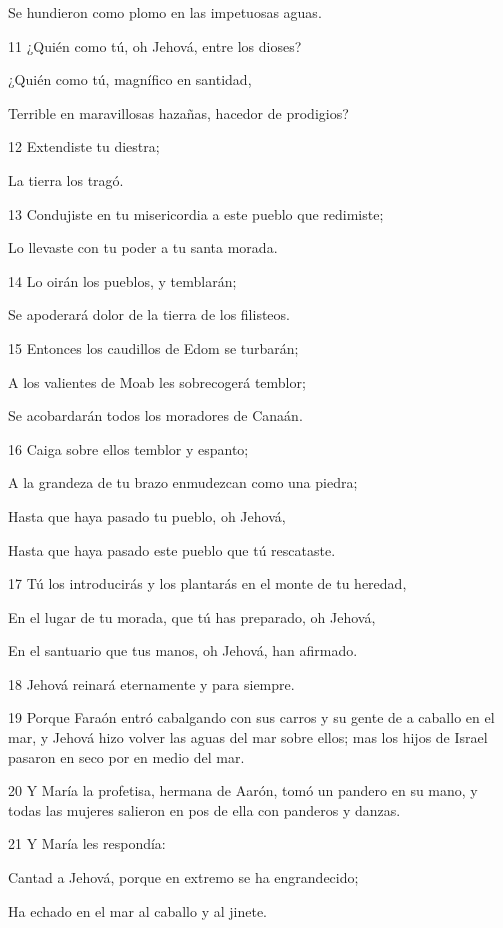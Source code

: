 \par Se hundieron como plomo en las impetuosas aguas.
\par 11 ¿Quién como tú, oh Jehová, entre los dioses?
\par ¿Quién como tú, magnífico en santidad,
\par Terrible en maravillosas hazañas, hacedor de prodigios?
\par 12 Extendiste tu diestra;
\par La tierra los tragó.
\par 13 Condujiste en tu misericordia a este pueblo que redimiste;
\par Lo llevaste con tu poder a tu santa morada.
\par 14 Lo oirán los pueblos, y temblarán;
\par Se apoderará dolor de la tierra de los filisteos.
\par 15 Entonces los caudillos de Edom se turbarán;
\par A los valientes de Moab les sobrecogerá temblor;
\par Se acobardarán todos los moradores de Canaán.
\par 16 Caiga sobre ellos temblor y espanto;
\par A la grandeza de tu brazo enmudezcan como una piedra;
\par Hasta que haya pasado tu pueblo, oh Jehová,
\par Hasta que haya pasado este pueblo que tú rescataste.
\par 17 Tú los introducirás y los plantarás en el monte de tu heredad,
\par En el lugar de tu morada, que tú has preparado, oh Jehová,
\par En el santuario que tus manos, oh Jehová, han afirmado.
\par 18 Jehová reinará eternamente y para siempre.
\par 19 Porque Faraón entró cabalgando con sus carros y su gente de a caballo en el mar, y Jehová hizo volver las aguas del mar sobre ellos; mas los hijos de Israel pasaron en seco por en medio del mar.
\par 20 Y María la profetisa, hermana de Aarón, tomó un pandero en su mano, y todas las mujeres salieron en pos de ella con panderos y danzas.
\par 21 Y María les respondía:
\par Cantad a Jehová, porque en extremo se ha engrandecido;
\par Ha echado en el mar al caballo y al jinete.

